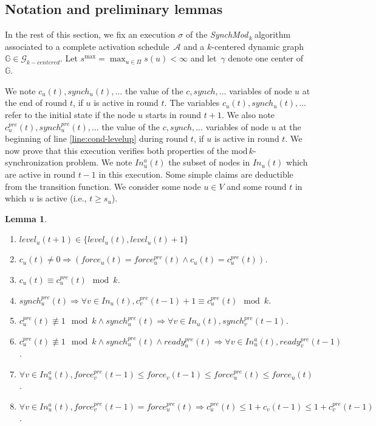 \documentclass[11pt,letterpaper]{article}
\newtheorem{lem}[thm]{Lemma}
\newcommand{\cent}{\gamma}
\newcommand{\SM}{{\em SynchMod}$_{\,k}\ $}
\begin{document}
\subsection{Notation and preliminary lemmas}

In the rest of this section, we fix an execution $\sigma$ of the \SM algorithm associated to a complete activation
schedule~$\mathcal{A}$ and a $k$-centered dynamic graph~$\mathds{G} \in \mathcal{G}_{k-centered}$. 
Let $s^{\max} = \max_{u \in \Pi} s(u) < \infty$ and let~$\cent$ denote one center of~$\mathds{G}$.

We note $c_u(t), synch_u(t), \dots$ the value of the $c, synch, \dots$ variables of node $u$ at the end of round $t$, if $u$ is active in round $t$.
The variables $c_u(t), synch_u(t), \dots$ refer to the initial state if the node $u$ starts in round $t+1$.
We also note $c^{pre}_u(t), synch^{pre}_u(t), \dots$ the value of the $c, synch, \dots$ variables
of node $u$ at the beginning of line \ref{line:cond-levelup} during round $t$, if $u$ is active in round $t$.
We now prove that this execution verifies both properties of the $\mathrm{mod}\,k$-synchronization problem.
We note $In_u^a(t)$ the subset of nodes in $In_u(t)$ which are active in round $t-1$ in this execution.
Some simple claims are deductible from the transition function.
We consider some node $u \in V$ and some round $t$ in which $u$ is active (i.e., $t \geq s_u$).
\begin{lem} \hfill
	\begin{enumerate}[label=\upshape(\alph*),ref=\thethm (\alph*)]
		\item\label{lem:cl1} $level_u(t+1) \in \{level_u(t), level_u(t)+1\}$
		\item\label{lem:cl2b}$c_u(t) \neq 0 \Rightarrow (force_u(t) = force_u^{pre}(t) \wedge c_u(t) = c_u^{pre}(t))$.
		\item\label{lem:cl2} $c_u(t) \equiv c_u^{pre}(t) \mod k$.
		\item\label{lem:cl3} $synch_u^{pre}(t) \Rightarrow \forall v \in In_u(t), c_v^{pre}(t-1) + 1 \equiv c_u^{pre}(t) \mod k$.
		\item\label{lem:cl4} $c_u^{pre}(t) \not\equiv 1 \mod k \wedge synch_u^{pre}(t) \Rightarrow \forall v \in In_u(t), synch_v^{pre}(t-1)$.
		\item\label{lem:cl5} $c_u^{pre}(t) \not\equiv 1 \mod k \wedge synch_u^{pre}(t) \wedge ready_u^{pre}(t) \Rightarrow \forall v \in In_u^a(t), ready_v^{pre}(t-1)$.
		\item\label{lem:cl6} $\forall v \in In_u^a(t), force_v^{pre}(t-1) \leq force_v(t-1) \leq force_u^{pre}(t) \leq force_u(t)$.
		\item\label{lem:cl7} $\forall v \in In_u^a(t), force_v^{pre}(t-1) = force_u^{pre}(t) \Rightarrow c_u^{pre}(t) \leq 1+c_v(t-1) \leq 1+c_v^{pre}(t-1)$.
	\end{enumerate}
\end{lem}
\end{document}
